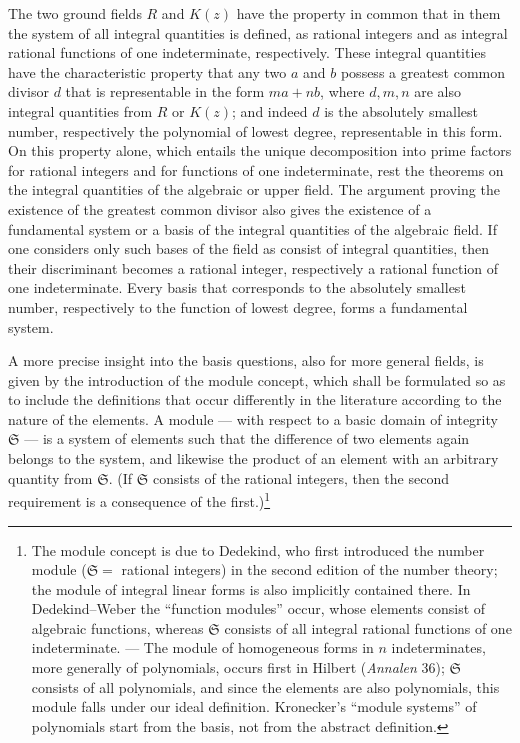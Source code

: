 \documentclass[11pt]{article}
\providecommand{\frS}{\mathfrak S}
\begin{document}
The two ground fields \(R\) and \(K(z)\) have the property in common that in them the system of all integral quantities is defined, as rational integers and as integral rational functions of one indeterminate, respectively. These integral quantities have the characteristic property that any two \(a\) and \(b\) possess a greatest common divisor \(d\) that is representable in the form \(ma+nb\), where \(d,m,n\) are also integral quantities from \(R\) or \(K(z)\); and indeed \(d\) is the absolutely smallest number, respectively the polynomial of lowest degree, representable in this form. On this property alone, which entails the unique decomposition into prime factors for rational integers and for functions of one indeterminate, rest the theorems on the integral quantities of the algebraic or upper field. The argument proving the existence of the greatest common divisor also gives the existence of a fundamental system or a basis of the integral quantities of the algebraic field. If one considers only such bases of the field as consist of integral quantities, then their discriminant becomes a rational integer, respectively a rational function of one indeterminate. Every basis that corresponds to the absolutely smallest number, respectively to the function of lowest degree, forms a fundamental system.

A more precise insight into the basis questions, also for more general fields, is given by the introduction of the module concept, which shall be formulated so as to include the definitions that occur differently in the literature according to the nature of the elements. A module --- with respect to a basic domain of integrity \(\frS\) --- is a system of elements such that the difference of two elements again belongs to the system, and likewise the product of an element with an arbitrary quantity from \(\frS\). (If \(\frS\) consists of the rational integers, then the second requirement is a consequence of the first.)\footnote{The module concept is due to Dedekind, who first introduced the number module (\(\frS=\) rational integers) in the second edition of the number theory; the module of integral linear forms is also implicitly contained there. In Dedekind--Weber the ``function modules'' occur, whose elements consist of algebraic functions, whereas \(\frS\) consists of all integral rational functions of one indeterminate. --- The module of homogeneous forms in \(n\) indeterminates, more generally of polynomials, occurs first in Hilbert (\emph{Annalen} 36); \(\frS\) consists of all polynomials, and since the elements are also polynomials, this module falls under our ideal definition. Kronecker's ``module systems'' of polynomials start from the basis, not from the abstract definition.}
\end{document}

